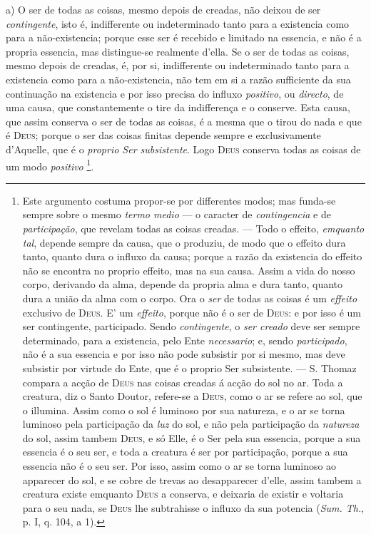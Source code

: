 a) O ser de todas as coisas, mesmo depois de creadas, não deixou de ser \emph{contingente}, isto é, indifferente ou indeterminado tanto para a existencia como para a não-existencia; porque esse ser é recebido e limitado na essencia, e não é a propria essencia, mas distingue-se realmente d'ella. Se o ser de todas as coisas, mesmo depois de creadas, é, por si, indifferente ou indeterminado tanto para a existencia como para a não-existencia, não tem em si a razão sufficiente da sua continuação na existencia e por isso precisa do influxo \emph{positivo}, ou \emph{directo}, de uma causa, que constantemente o tire da indifferença e o conserve. Esta causa, que assim conserva o ser de todas as coisas, é a mesma que o tirou do nada e que é \textsc{Deus}; porque o ser das coisas finitas depende sempre e exclusivamente d'Aquelle, que é o \emph{proprio Ser subsistente}. Logo \textsc{Deus} conserva todas as coisas de um modo \emph{positivo} \footnote{Este argumento costuma propor-se por differentes modos; mas funda-se sempre sobre o mesmo \emph{termo medio} --- o caracter de \emph{contingencia} e de \emph{participação}, que revelam todas as coisas creadas. --- Todo o effeito, \emph{emquanto tal}, depende sempre da causa, que o produziu, de modo que o effeito dura tanto, quanto dura o influxo da causa; porque a razão da existencia do effeito não se encontra no proprio effeito, mas na sua causa. Assim a vida do nosso corpo, derivando da alma, depende da propria alma e dura tanto, quanto dura a união da alma com o corpo. Ora o \emph{ser} de todas as coisas é um \emph{effeito} exclusivo de \textsc{Deus}. E' um \emph{effeito}, porque não é o ser de \textsc{Deus}: e por isso é um ser contingente, participado. Sendo \emph{contingente}, o \emph{ser creado} deve ser sempre determinado, para a existencia, pelo Ente \emph{necessario}; e, sendo \emph{participado}, não é a sua essencia e por isso não pode subsistir por si mesmo, mas deve subsistir por virtude do Ente, que é o proprio Ser subsistente. --- S. Thomaz compara a acção de \textsc{Deus} nas coisas creadas á acção do sol no ar. Toda a creatura, diz o Santo Doutor, refere-se a \textsc{Deus}, como o ar se refere ao sol, que o illumina. Assim como o sol é luminoso por sua natureza, e o ar se torna luminoso pela participação da \emph{luz} do sol, e não pela participação da \emph{natureza} do sol, assim tambem \textsc{Deus}, e só Elle, é o Ser pela sua essencia, porque a sua essencia é o seu ser, e toda a creatura é ser por participação, porque a sua essencia não é o seu ser. Por isso, assim como o ar se torna luminoso ao apparecer do sol, e se cobre de trevas ao desapparecer d'elle, assim tambem a creatura existe emquanto \textsc{Deus} a conserva, e deixaria de existir e voltaria para o seu nada, se \textsc{Deus} lhe subtrahisse o influxo da sua potencia (\emph{Sum. Th.}, p. I, q. 104, a 1).}.

